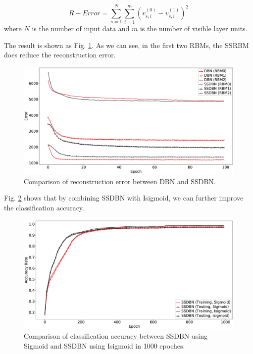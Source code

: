 \documentclass{bioinfo}
\begin{document}
\begin{equation}
R-Error = \sum_{s=1}^{N}\sum_{i=1}^{m}(v_{s,i}^{(0)}-v_{s,i}^{(1)})^2
\end{equation}
where $N$ is the number of input data and $m$ is the number of visible layer units.

The result is shown as Fig. \ref{fig:RBM012}. As we can see, in the first two RBMs, the SSRBM does reduce the reconstruction error.

\begin{figure}[htbp]
	\centering
	\includegraphics[width=\columnwidth]{RBM012.eps}
	\caption{Comparison of reconstruction error between DBN and SSDBN.}
	\label{fig:RBM012}
\end{figure}

Fig. \ref{fig:SSDBNIsigmoid} shows that by combining SSDBN with Isigmoid, we can further improve the classification accuracy.

\begin{figure}[htbp]
	\centering
	\includegraphics[width=\columnwidth]{SSDBNIsigmoid.eps}
	\caption{Comparison of classification accuracy between SSDBN using Sigmoid and SSDBN using Isigmoid in 1000 epoches.}
	\label{fig:SSDBNIsigmoid}
\end{figure}
\end{document}
